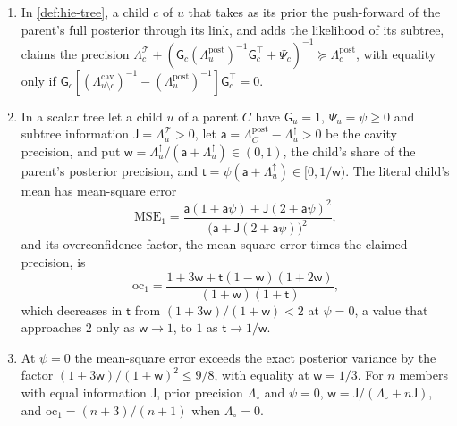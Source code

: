 \begin{proposition}\label{prop:hie-literal-once}
\begin{enumerate}
\item[(a)] In \cref{def:hie-tree}, a child $c$ of $u$ that takes as its prior the push-forward of the parent's full posterior through its link, and adds the likelihood of its subtree, claims the precision $\Lambda^{\mathcal T}_c+(\mathsf G_c(\Lambda^{\mathrm{post}}_u)^{-1}\mathsf G_c^\top+\Psi_c)^{-1}\succeq\Lambda^{\mathrm{post}}_c$, with equality only if $\mathsf G_c[(\Lambda^{\mathrm{cav}}_{u\setminus c})^{-1}-(\Lambda^{\mathrm{post}}_u)^{-1}]\mathsf G_c^\top=0$.
\item[(b)] In a scalar tree let a child $u$ of a parent $C$ have $\mathsf G_u=1$, $\Psi_u=\psi\ge0$ and subtree information $\mathsf J=\Lambda^{\mathcal T}_u>0$, let $\mathsf a=\Lambda^{\mathrm{post}}_C-\Lambda^\uparrow_u>0$ be the cavity precision, and put $\mathsf w=\Lambda^\uparrow_u/(\mathsf a+\Lambda^\uparrow_u)\in(0,1)$, the child's share of the parent's posterior precision, and $\mathsf t=\psi(\mathsf a+\Lambda^\uparrow_u)\in[0,1/\mathsf w)$. The literal child's mean has mean-square error
\begin{equation}\label{eq:hie-literal-mse}
\mathrm{MSE}_1=\frac{\mathsf a(1+\mathsf a\psi)+\mathsf J(2+\mathsf a\psi)^2}{\bigl(\mathsf a+\mathsf J(2+\mathsf a\psi)\bigr)^2},
\end{equation}
and its overconfidence factor, the mean-square error times the claimed precision, is
\begin{equation}\label{eq:hie-oc}
\mathrm{oc}_1=\frac{1+3\mathsf w+\mathsf t(1-\mathsf w)(1+2\mathsf w)}{(1+\mathsf w)(1+\mathsf t)},
\end{equation}
which decreases in $\mathsf t$ from $(1+3\mathsf w)/(1+\mathsf w)<2$ at $\psi=0$, a value that approaches $2$ only as $\mathsf w\to1$, to $1$ as $\mathsf t\to1/\mathsf w$.
\item[(c)] At $\psi=0$ the mean-square error exceeds the exact posterior variance by the factor $(1+3\mathsf w)/(1+\mathsf w)^2\le9/8$, with equality at $\mathsf w=1/3$. For $n$ members with equal information $\mathsf J$, prior precision $\Lambda_\circ$ and $\psi=0$, $\mathsf w=\mathsf J/(\Lambda_\circ+n\mathsf J)$, and $\mathrm{oc}_1=(n+3)/(n+1)$ when $\Lambda_\circ=0$.
\end{enumerate}
\end{proposition}

